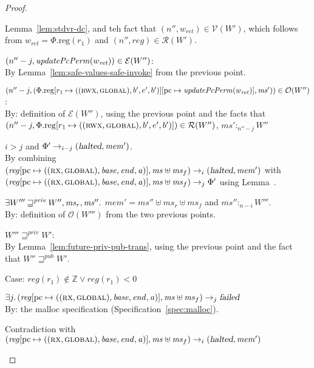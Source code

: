 \documentclass[a4paper]{article}
\newcommand{\update}[2]{[#1 \mapsto #2]}
\newcommand{\var}[1]{\mathit{#1}}
\newcommand{\hs}{\var{ms}}
\newcommand{\ms}{\hs}
\newcommand{\pcreg}{\mathrm{pc}}
\newcommand{\addr}{\var{a}}
\newcommand{\start}{\var{base}}
\newcommand{\addrend}{\var{end}}
\newcommand{\mem}{\var{mem}}
\newcommand{\reg}{\var{reg}}
\newcommand{\heap}{\var{mem}}
\newcommand{\plainproj}[1]{\mathrm{#1}}
\newcommand{\memreg}[1][\Phi]{#1.\plainproj{reg}}
\newcommand{\failed}{\textsl{failed}}
\newcommand{\halted}{\textsl{halted}}
\newcommand{\plainfun}[2]{
  \ifthenelse{\equal{#2}{}}
  {\mathit{#1}}
  {\mathit{#1}(#2)}
}
\newcommand{\updatePcPerm}[1]{\plainfun{updatePcPerm}{#1}}
\newcommand{\futurewk}{\mathbin{\sqsupseteq}^{\var{pub}}}
\newcommand{\futurestr}{\mathbin{\sqsupseteq}^{\var{priv}}}
\newcommand{\heapSat}[3][\heap]{#1 :_{#2} #3}
\newcommand{\asmType}{\plaindom{AsmType}}
\newcommand{\plaindom}[1]{\mathrm{#1}}
\newcommand{\ints}{\mathbb{Z}}
\newcommand{\intr}[2]{\mathcal{#1}}
\newcommand{\valueintr}[1]{\intr{V}{#1}}
\newcommand{\exprintr}[1]{\intr{E}{#1}}
\newcommand{\regintr}[1]{\intr{R}{#1}}
\newcommand{\stdvr}{\valueintr{\asmType}}
\newcommand{\stder}{\exprintr{\asmType}}
\newcommand{\stdrr}{\regintr{\asmType}}
\newcommand{\observations}{\mathcal{O}}
\newcommand{\npair}[2][n]{\left(#1,#2 \right)}
\newcommand{\plainperm}[1]{\textsc{#1}}
\newcommand{\exec}{\plainperm{rx}}
\newcommand{\rwx}{\plainperm{rwx}}
\newcommand{\glob}{\plainperm{global}}
\newcommand{\step}[1][]{\rightarrow_{#1}}
\begin{document}
\begin{proof}
\begin{enumproof}
\begin{enumproof}
      Lemma~\ref{lem:stdvr-dc}, and teh fact that
      $\npair[n'']{w_{\var{ret}}}\in\stdvr(W')$, which follows from
      $w_{\var{ret}} = \memreg(r_1)$ and $\npair[n'']{\reg}\in\stdrr(W')$.
    \item $\npair[n''-j]{\updatePcPerm{w_{\var{ret}}}} \in \stder(W'')$:\\
      By Lemma~\ref{lem:safe-values-safe-invoke} from the previous point.
    \item
      $\npair[n''-j]{(\memreg[\Phi]\update{r_1}{((\rwx,\glob),b',e',b')}\update{\pcreg}{\updatePcPerm{w_{\var{ret}}}},
        \ms')} \in \observations(W'')$:\\
      By: definition of $\stder(W'')$, using the previous point and the facts
      that
      $\npair[n''-j]{\memreg[\Phi]\update{r_1}{((\rwx,\glob),b',e',b')}}\in\stdrr(W'')$,
      $\heapSat[\ms']{n''-j}{W''}$
    \item $i > j$ and $\Phi'\step[i-j]
      (\halted,\mem')$.\\
      By combining
      $(\reg\update{\pcreg}{((\exec,\glob),\start,\addrend,\addr)},\ms\uplus\ms_f)\step[i]
      (\halted,\mem')$ with
      $(\reg\update{\pcreg}{((\exec,\glob),\start,\addrend,\addr)},\ms\uplus\ms_f)
      \step[j] \Phi'$ using Lemma~\label{lem:determinacy}.
    \item $\exists W''' \futurestr W'', \hs_r, \hs'' \ldotp$ $\heap' = \hs'' \uplus \hs_r \uplus \ms_f$ and $\heapSat[\hs'']{n-i}{W'''}$.\\
      By: definition of $\observations(W''')$ from the two previous points.
    \item $W''' \futurestr W'$: \\
      By Lemma~\ref{lem:future-priv-pub-trans}, using the previous point and the fact that $W'' \futurewk
      W'$.
    \end{enumproof}
  \item Case: $\reg(r_1)\not\in\ints \vee \reg(r_1) < 0$
    \begin{enumproof}
    \item $\exists j\ldotp (\reg\update{\pcreg}{((\exec,\glob),\start,\addrend,\addr)},\ms\uplus\ms_f)\step[j]
      \failed$\\
      By: the malloc specification (Specification~\ref{spec:malloc}).
    \item Contradiction with 
      $(\reg\update{\pcreg}{((\exec,\glob),\start,\addrend,\addr)},\ms\uplus\ms_f)\step[i]
      (\halted,\mem')$
    \end{enumproof}
  \end{enumproof}
\end{proof}
\end{document}
